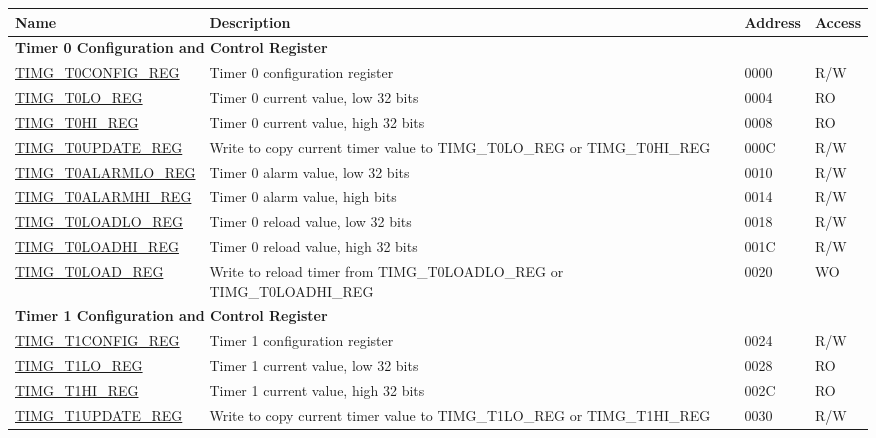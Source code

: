 \begin{longtable}{ | p{6cm} | p{7.2cm} | p{1.3cm} | p{1cm} | }
\hline\rowcolor{lightgray}
Name & Description &  Address & Access \\ \hline
\endhead
\multicolumn{4}{|l|}{\textbf{Timer 0 Configuration and Control Register}} \\ \hline
\hyperref[regdesc:TIMGTXCONFIGREG]{TIMG\_T0CONFIG\_REG} & Timer 0 configuration register & \hexprefix{}0000 & R/W \\ \hline
\hyperref[regdesc:TIMGTXLOREG]{TIMG\_T0LO\_REG} & Timer 0 current value, low 32 bits & \hexprefix{}0004 & RO \\ \hline
\hyperref[regdesc:TIMGTXHIREG]{TIMG\_T0HI\_REG} & Timer 0 current value, high 32 bits & \hexprefix{}0008 & RO \\ \hline
\hyperref[regdesc:TIMGTXUPDATEREG]{TIMG\_T0UPDATE\_REG} & Write to copy current timer value to TIMG\_T0LO\_REG or TIMG\_T0HI\_REG & \hexprefix{}000C & R/W \\ \hline
\hyperref[regdesc:TIMGTXALARMLOREG]{TIMG\_T0ALARMLO\_REG} & Timer 0 alarm value, low 32 bits & \hexprefix{}0010 & R/W \\ \hline
\hyperref[regdesc:TIMGTXALARMHIREG]{TIMG\_T0ALARMHI\_REG} & Timer 0 alarm value, high bits & \hexprefix{}0014 & R/W \\ \hline
\hyperref[regdesc:TIMGTXLOADLOREG]{TIMG\_T0LOADLO\_REG} & Timer 0 reload value, low 32 bits & \hexprefix{}0018 & R/W \\ \hline
\hyperref[regdesc:TIMGTXLOADHIREG]{TIMG\_T0LOADHI\_REG} & Timer 0 reload value, high 32 bits & \hexprefix{}001C & R/W \\ \hline
\hyperref[regdesc:TIMGTXLOADREG]{TIMG\_T0LOAD\_REG} & Write to reload timer from TIMG\_T0LOADLO\_REG or TIMG\_T0LOADHI\_REG & \hexprefix{}0020 & WO \\ \hline
\multicolumn{4}{|l|}{\textbf{Timer 1 Configuration and Control Register}} \\ \hline
\hyperref[regdesc:TIMGTXCONFIGREG]{TIMG\_T1CONFIG\_REG} & Timer 1 configuration register & \hexprefix{}0024 & R/W \\ \hline
\hyperref[regdesc:TIMGTXLOREG]{TIMG\_T1LO\_REG} & Timer 1 current value, low 32 bits & \hexprefix{}0028 & RO \\ \hline
\hyperref[regdesc:TIMGTXHIREG]{TIMG\_T1HI\_REG} & Timer 1 current value, high 32 bits & \hexprefix{}002C & RO \\ \hline
\hyperref[regdesc:TIMGTXUPDATEREG]{TIMG\_T1UPDATE\_REG} & Write to copy current timer value to TIMG\_T1LO\_REG or TIMG\_T1HI\_REG & \hexprefix{}0030 & R/W \\ \hline

\end{longtable}

